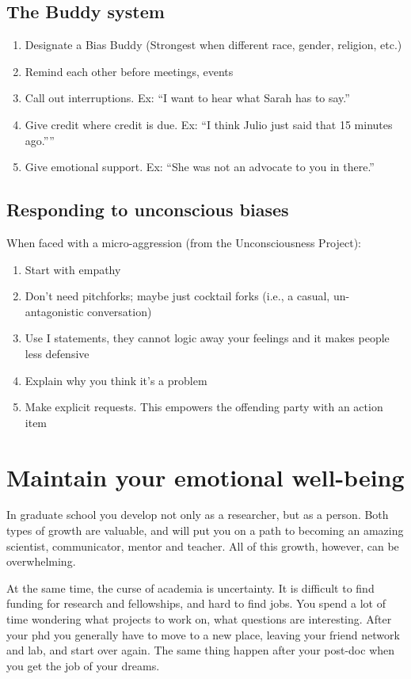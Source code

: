 \documentclass[12pt]{article}
\begin{document}
\subsection{The Buddy system}
\label{sec:buddy}
\begin{enumerate}
\item Designate a Bias Buddy (Strongest when different race, gender,
  religion, etc.)
\item Remind each other before meetings, events
\item Call out interruptions. Ex: ``I want to hear what Sarah has to
  say.''
\item Give credit where credit is due. Ex: ``I think Julio just said
  that 15 minutes ago.”''
\item Give emotional support. Ex: ``She was not an advocate to you in
  there.''
\end{enumerate}

\subsection{Responding to unconscious biases}
\label{sec:responding}
When faced with a micro-aggression (from the Unconsciousness Project):
\begin{enumerate}
\item Start with empathy
\item Don't need pitchforks; maybe just cocktail forks (i.e., a
  casual, un-antagonistic conversation)
\item Use I statements, they cannot logic away your feelings and it
  makes people less defensive
\item Explain why you think it's a problem
\item Make explicit requests. This empowers the offending party with
  an action item

\end{enumerate}


\section{Maintain your emotional well-being}
\label{sec:wellBeing}

In graduate school you develop not only as a researcher, but as a
person. Both types of growth are valuable, and will put you on a path
to becoming an amazing scientist, communicator, mentor and
teacher. All of this growth, however, can be overwhelming.

At the same time, the curse of academia is uncertainty. It is
difficult to find funding for research and fellowships, and hard to
find jobs. You spend a lot of time wondering what projects to work on,
what questions are interesting. After your phd you generally have to
move to a new place, leaving your friend network and lab, and start
over again. The same thing happen after your post-doc when you get the
job of your dreams.
\end{document}
